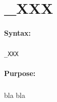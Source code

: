 
\newpage
\section{\_XXX}
\label{cmd:_XXX}

\paragraph{Syntax:}
\subparagraph{}
\texttt{\_XXX}

\paragraph{Purpose:}
\subparagraph{}
bla bla